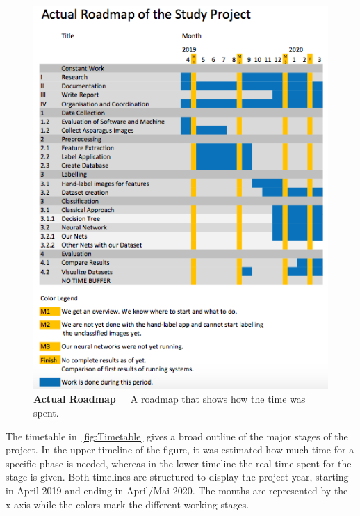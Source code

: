 \begin{figure}[h]
	\centering
	\includegraphics[scale=0.7]{Figures/chapter02/roadmap_actual.png}
	\decoRule
	\caption[Actual Roadmap]{\textbf{Actual Roadmap}~~~A roadmap that shows how the time was spent.}
	\label{fig:RoadmapActual}
\end{figure}

The timetable in~\autoref{fig:Timetable} gives a broad outline of the major stages of the project. In the upper timeline of the figure, it was estimated how much time for a specific phase is needed, whereas in the lower timeline the real time spent for the stage is given. Both timelines are structured to display the project year, starting in April 2019 and ending in April/Mai 2020. The months are represented by the x-axis while the colors mark the different working stages.

